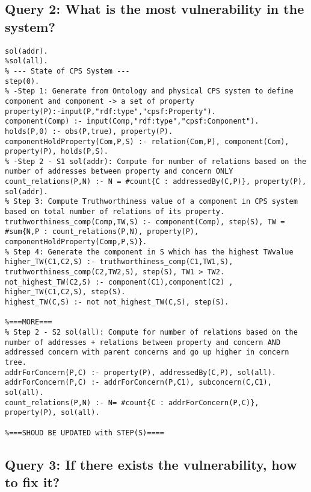 \subsection{Query 2: What is the most vulnerability in the system?}
%
\begin{lstlisting}[language=clingo,caption=Reasoning for Truthworthiness aspect, label=lst:q_2_truthworthiness_cal, mathescape=true,xleftmargin=.01\textwidth, breaklines=true]
% --- Configuration ---
sol(addr).
%sol(all).
% --- State of CPS System ---
step(0).
% -Step 1: Generate from Ontology and physical CPS system to define component and component -> a set of property
property(P):-input(P,"rdf:type","cpsf:Property").
component(Comp) :- input(Comp,"rdf:type","cpsf:Component").
holds(P,0) :- obs(P,true), property(P).
componentHoldProperty(Com,P,S) :- relation(Com,P), component(Com), property(P), holds(P,S).
% -Step 2 - S1 sol(addr): Compute for number of relations based on the number of addresses between property and concern ONLY
count_relations(P,N) :- N = #count{C : addressedBy(C,P)}, property(P), sol(addr).
% Step 3: Compute Truthworthiness value of a component in CPS system based on total number of relations of its property.
truthworthiness_comp(Comp,TW,S) :- component(Comp), step(S), TW = #sum{N,P : count_relations(P,N), property(P), componentHoldProperty(Comp,P,S)}.
% Step 4: Generate the component in S which has the highest TWvalue
higher_TW(C1,C2,S) :- truthworthiness_comp(C1,TW1,S), truthworthiness_comp(C2,TW2,S), step(S), TW1 > TW2.
not_highest_TW(C2,S) :- component(C1),component(C2) , higher_TW(C1,C2,S), step(S).
highest_TW(C,S) :- not not_highest_TW(C,S), step(S).

%===MORE===
% Step 2 - S2 sol(all): Compute for number of relations based on the number of addresses + relations between property and concern AND addressed concern with parent concerns and go up higher in concern tree.
addrForConcern(P,C) :- property(P), addressedBy(C,P), sol(all).
addrForConcern(P,C) :- addrForConcern(P,C1), subconcern(C,C1), sol(all).
count_relations(P,N) :- N= #count{C : addrForConcern(P,C)}, property(P), sol(all).

%===SHOUD BE UPDATED with STEP(S)====
\end{lstlisting}
%
  
%
\subsection{Query 3: If there exists the vulnerability, how to fix it?}
%
\begin{lstlisting}[language=clingo,caption=Reasoning for Truthworthiness aspect, label=list8, mathescape=true,xleftmargin=.01\textwidth, breaklines=true]

\end{lstlisting}
%